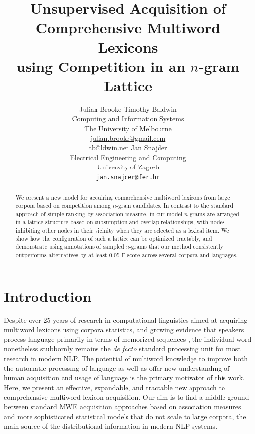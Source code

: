 \documentclass[11pt,letterpaper]{article}
\title{Unsupervised Acquisition of Comprehensive Multiword Lexicons \\ using Competition in an $n$-gram Lattice}
\author{Julian Brooke \qquad Timothy Baldwin \\ Computing and Information Systems \\ The University of Melbourne \\ \url{julian.brooke@gmail.com} \\ \url{tb@ldwin.net}
 \And               Jan Snajder\\
Electrical Engineering and Computing \\
 University of Zagreb \\
  {\tt jan.snajder@fer.hr}}
\date{}
\begin{document}
\maketitle


\begin{abstract}
We present a new model for acquiring comprehensive multiword lexicons from large corpora based on  competition among $n$-gram candidates. In contrast to the standard approach of simple ranking by association measure, in our model $n$-grams are arranged in a lattice structure based on subsumption and overlap relationships, with nodes inhibiting other nodes in their vicinity when they are selected as a lexical item. We show how the configuration of such a lattice can be optimized tractably, and demonstrate using annotations of sampled $n$-grams that our method consistently outperforms alternatives by at least 0.05 F-score across several corpora and languages.
\end{abstract}


\section{Introduction}

Despite over 25 years of research in computational linguistics aimed at acquiring multiword lexicons using corpora statistics, and growing evidence that speakers process language primarily in terms of memorized sequences \cite{Wray08}, the individual word nonetheless stubbornly remains the \textit{de facto} standard processing unit for most research in modern NLP. The potential of multiword knowledge to improve both the automatic processing of language as well as offer new understanding of human acquisition and usage of language is the primary motivator of this work. Here, we present an effective, expandable, and tractable new approach to comprehensive multiword lexicon acquisition. Our aim is to find a middle ground between standard MWE acquisition approaches based on association measures \cite{Ramisch14} and more sophisticated statistical models \cite{Newman12} that do not scale to large corpora, the main source of the distributional information in modern NLP systems.


\end{document}
